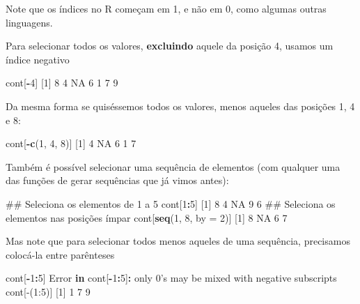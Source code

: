 \documentclass[10pt,a4paper]{book}
\newenvironment{Shaded}{\begin{snugshade}}{\end{snugshade}}
\newcommand{\KeywordTok}[1]{\textcolor[rgb]{0.13,0.29,0.53}{\textbf{#1}}}
\newcommand{\DataTypeTok}[1]{\textcolor[rgb]{0.13,0.29,0.53}{#1}}
\newcommand{\DecValTok}[1]{\textcolor[rgb]{0.00,0.00,0.81}{#1}}
\newcommand{\StringTok}[1]{\textcolor[rgb]{0.31,0.60,0.02}{#1}}
\newcommand{\OtherTok}[1]{\textcolor[rgb]{0.56,0.35,0.01}{#1}}
\newcommand{\ControlFlowTok}[1]{\textcolor[rgb]{0.13,0.29,0.53}{\textbf{#1}}}
\newcommand{\OperatorTok}[1]{\textcolor[rgb]{0.81,0.36,0.00}{\textbf{#1}}}
\newcommand{\NormalTok}[1]{#1}
\begin{document}
Note que os índices no R começam em 1, e não em 0, como algumas outras
linguagens.

Para selecionar todos os valores, \textbf{excluindo} aquele da posição
4, usamos um índice negativo

\begin{Shaded}
\begin{Highlighting}[]
\NormalTok{cont[}\OperatorTok{-}\DecValTok{4}\NormalTok{]}
\NormalTok{[}\DecValTok{1}\NormalTok{]  }\DecValTok{8}  \DecValTok{4} \OtherTok{NA}  \DecValTok{6}  \DecValTok{1}  \DecValTok{7}  \DecValTok{9}
\end{Highlighting}
\end{Shaded}

Da mesma forma se quiséssemos todos os valores, menos aqueles das
posições 1, 4 e 8:

\begin{Shaded}
\begin{Highlighting}[]
\NormalTok{cont[}\OperatorTok{-}\KeywordTok{c}\NormalTok{(}\DecValTok{1}\NormalTok{, }\DecValTok{4}\NormalTok{, }\DecValTok{8}\NormalTok{)]}
\NormalTok{[}\DecValTok{1}\NormalTok{]  }\DecValTok{4} \OtherTok{NA}  \DecValTok{6}  \DecValTok{1}  \DecValTok{7}
\end{Highlighting}
\end{Shaded}

Também é possível selecionar uma sequência de elementos (com qualquer
uma das funções de gerar sequências que já vimos antes):

\begin{Shaded}
\begin{Highlighting}[]
\NormalTok{## Seleciona os elementos de 1 a 5}
\NormalTok{cont[}\DecValTok{1}\OperatorTok{:}\DecValTok{5}\NormalTok{]}
\NormalTok{[}\DecValTok{1}\NormalTok{]  }\DecValTok{8}  \DecValTok{4} \OtherTok{NA}  \DecValTok{9}  \DecValTok{6}
\NormalTok{## Seleciona os elementos nas posições ímpar}
\NormalTok{cont[}\KeywordTok{seq}\NormalTok{(}\DecValTok{1}\NormalTok{, }\DecValTok{8}\NormalTok{, }\DataTypeTok{by =} \DecValTok{2}\NormalTok{)]}
\NormalTok{[}\DecValTok{1}\NormalTok{]  }\DecValTok{8} \OtherTok{NA}  \DecValTok{6}  \DecValTok{7}
\end{Highlighting}
\end{Shaded}

Mas note que para selecionar todos menos aqueles de uma sequência,
precisamos colocá-la entre parênteses

\begin{Shaded}
\begin{Highlighting}[]
\NormalTok{cont[}\OperatorTok{-}\DecValTok{1}\OperatorTok{:}\DecValTok{5}\NormalTok{]}
\NormalTok{Error }\ControlFlowTok{in}\NormalTok{ cont[}\OperatorTok{-}\DecValTok{1}\OperatorTok{:}\DecValTok{5}\NormalTok{]}\OperatorTok{:}\StringTok{ }\NormalTok{only }\DecValTok{0}\StringTok{'s may be mixed with negative subscripts}
\StringTok{cont[-(1:5)]}
\StringTok{[1] 1 7 9}
\end{Highlighting}
\end{Shaded}
\end{document}
